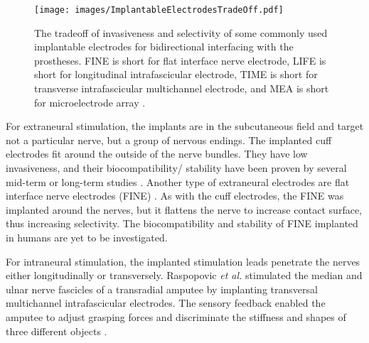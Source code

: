  \begin{figure}[htb]
    \centering
       \texttt{[image: images/ImplantableElectrodesTradeOff.pdf]}
        \caption{The tradeoff of invasiveness and selectivity of some commonly used implantable electrodes for bidirectional interfacing with the prostheses. FINE is short for flat interface nerve electrode, LIFE is short for longitudinal intrafascicular electrode, TIME is short for transverse intrafascicular multichannel electrode, and MEA is short for microelectrode array \cite{ortiz2012viability}.}
        \label{fig:implanted_electrodes_tradeoff}
\end{figure}

For extraneural stimulation, the implants are in the subcutaneous field and target not a particular nerve, but a group of nervous endings. The implanted cuff electrodes fit around the outside of the nerve bundles. They have low invasiveness, and their biocompatibility/ stability have been proven by several mid-term or long-term studies \cite{christie2017longterm, tan2014neural}. Another type of extraneural electrodes are flat interface nerve electrodes (FINE) \cite{tyler2002functionally}. As with the cuff electrodes, the FINE was implanted around the nerves, but it flattens the nerve to increase contact surface, thus increasing selectivity. The biocompatibility and stability of FINE implanted in humans are yet to be investigated.  

For intraneural stimulation, the implanted stimulation leads penetrate the nerves either longitudinally or transversely. Raspopovic \textit{et al.} stimulated the median and ulnar nerve fascicles of a transradial amputee by implanting transversal multichannel intrafascicular electrodes. The sensory feedback enabled the amputee to adjust grasping forces and discriminate the stiffness and shapes of three different objects \cite{raspopovic2014restoring}. 


